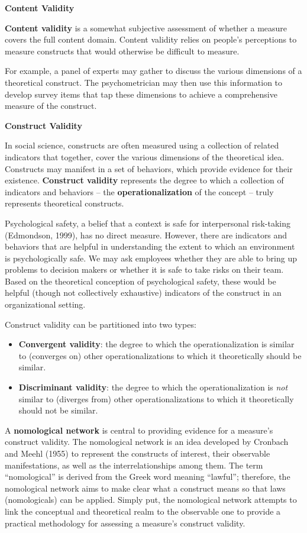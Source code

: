 \documentclass[
]{book}
\providecommand{\tightlist}{%
  \setlength{\itemsep}{0pt}\setlength{\parskip}{0pt}}
\begin{document}
\textbf{Content Validity}

\textbf{Content validity} is a somewhat subjective assessment of whether a measure covers the full content domain. Content validity relies on people's perceptions to measure constructs that would otherwise be difficult to measure.

For example, a panel of experts may gather to discuss the various dimensions of a theoretical construct. The psychometrician may then use this information to develop survey items that tap these dimensions to achieve a comprehensive measure of the construct.

\textbf{Construct Validity}

In social science, constructs are often measured using a collection of related indicators that together, cover the various dimensions of the theoretical idea. Constructs may manifest in a set of behaviors, which provide evidence for their existence. \textbf{Construct validity} represents the degree to which a collection of indicators and behaviors -- the \textbf{operationalization} of the concept -- truly represents theoretical constructs.

Psychological safety, a belief that a context is safe for interpersonal risk-taking (Edmondson, 1999), has no direct measure. However, there are indicators and behaviors that are helpful in understanding the extent to which an environment is psychologically safe. We may ask employees whether they are able to bring up problems to decision makers or whether it is safe to take risks on their team. Based on the theoretical conception of psychological safety, these would be helpful (though not collectively exhaustive) indicators of the construct in an organizational setting.

Construct validity can be partitioned into two types:

\begin{itemize}
\tightlist
\item
  \textbf{Convergent validity}: the degree to which the operationalization is similar to (converges on) other operationalizations to which it theoretically should be similar.
\item
  \textbf{Discriminant validity}: the degree to which the operationalization is \emph{not} similar to (diverges from) other operationalizations to which it theoretically should not be similar.
\end{itemize}

A \textbf{nomological network} is central to providing evidence for a measure's construct validity. The nomological network is an idea developed by Cronbach and Meehl (1955) to represent the constructs of interest, their observable manifestations, as well as the interrelationships among them. The term ``nomological'' is derived from the Greek word meaning ``lawful''; therefore, the nomological network aims to make clear what a construct means so that laws (nomologicals) can be applied. Simply put, the nomological network attempts to link the conceptual and theoretical realm to the observable one to provide a practical methodology for assessing a measure's construct validity.
\end{document}
